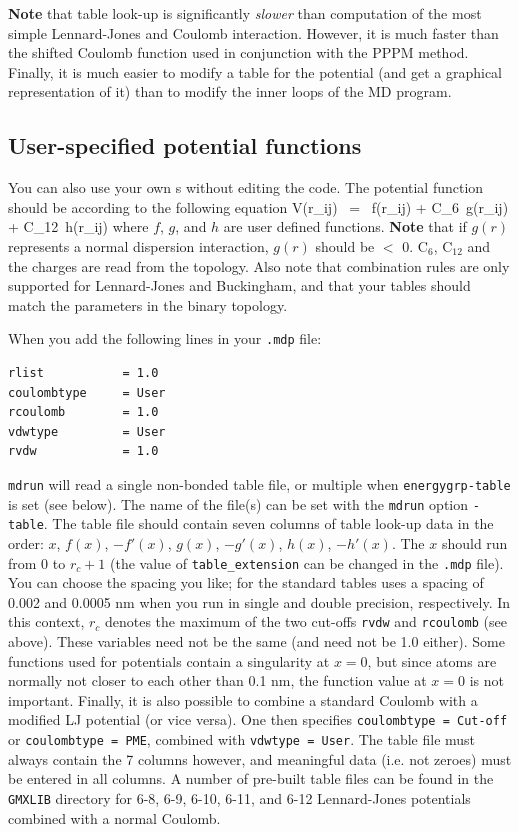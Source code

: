 {\bf Note} that table look-up is significantly {\em
slower} than computation of the most simple Lennard-Jones and Coulomb
interaction. However, it is much faster than the shifted Coulomb
function used in conjunction with the PPPM method. Finally, it is much
easier to modify a table for the potential (and get a graphical
representation of it) than to modify the inner loops of the MD
program.

\subsection{User-specified potential functions}
You can also use your own s 
without editing the {\gromacs} code. 
The potential function should be according to the following equation
\beq
V(r_{ij}) ~=~  f(r_{ij}) + C_6 \,g(r_{ij}) + C_{12} \,h(r_{ij})
\eeq
where $f$, $g$, and $h$ are user defined functions. {\bf Note} that if $g(r)$ represents a
normal dispersion interaction, $g(r)$ should be $<$ 0. C$_6$, C$_{12}$
and the charges are read from the topology. Also note that combination
rules are only supported for Lennard-Jones and Buckingham, and that
your tables should match the parameters in the binary topology.

When you add the following lines in your {\tt .mdp} file:

{\small
\begin{verbatim}
rlist           = 1.0
coulombtype     = User
rcoulomb        = 1.0
vdwtype         = User
rvdw            = 1.0
\end{verbatim}}

{\tt mdrun} will read a single non-bonded table file,
or multiple when {\tt energygrp-table} is set (see below).
The name of the file(s) can be set with the {\tt mdrun} option {\tt -table}.
The table file should contain seven columns of table look-up data in the
order: $x$, $f(x)$, $-f'(x)$, $g(x)$, $-g'(x)$, $h(x)$, $-h'(x)$.
The $x$ should run from 0 to $r_c+1$ (the value of {\tt table_extension} can be
changed in the {\tt .mdp} file).
You can choose the spacing you like; for the standard tables {\gromacs}
uses a spacing of 0.002 and 0.0005 nm when you run in single
and double precision, respectively.  In this
context, $r_c$ denotes the maximum of the two cut-offs {\tt rvdw} and
{\tt rcoulomb} (see above). These variables need not be the same (and
need not be 1.0 either).  Some functions used for potentials contain a
singularity at $x = 0$, but since atoms are normally not closer to each
other than 0.1 nm, the function value at $x = 0$ is not important.
Finally, it is also
possible to combine a standard Coulomb with a modified LJ potential
(or vice versa). One then specifies {\eg} {\tt coulombtype = Cut-off} or
{\tt coulombtype = PME}, combined with {\tt vdwtype = User}.  The table file must
always contain the 7 columns however, and meaningful data (i.e. not
zeroes) must be entered in all columns.  A number of pre-built table
files can be found in the {\tt GMXLIB} directory for 6-8, 6-9, 6-10, 6-11, and 6-12
Lennard-Jones potentials combined with a normal Coulomb.

